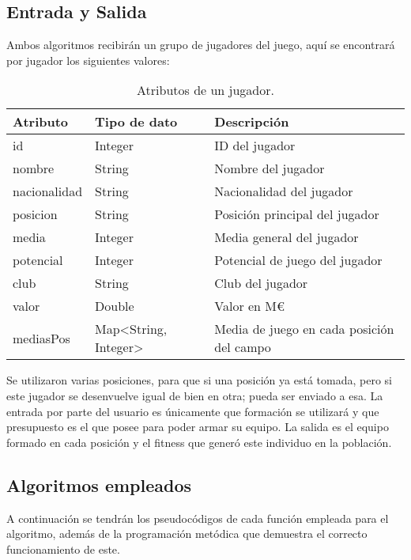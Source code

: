 \documentclass[11pt, twocolumn]{article}
\begin{document}
\subsection{Entrada y Salida}
Ambos algoritmos recibirán un grupo de jugadores del juego, aquí se encontrará por jugador los siguientes valores:

\begin{table}[H]
    \centering
    \begin{tabularx}{\columnwidth}{|X|X|X|}
        \hline
        Atributo & Tipo de dato & Descripción \\
        \hline
        id & Integer & ID del jugador\\
        nombre & String & Nombre del jugador \\
        nacionalidad & String & Nacionalidad del jugador\\
        posicion & String & Posición principal del jugador\\
        media & Integer & Media general del jugador\\
        potencial & Integer & Potencial de juego del jugador\\
        club & String & Club del jugador\\
        valor & Double & Valor en M€\\
        mediasPos & Map<String, Integer> & Media de juego en cada posición del campo\\
        
        \hline
    \end{tabularx}
    \caption{Atributos de un jugador.}
    \label{tab:etiqueta}
\end{table}

Se utilizaron varias posiciones, para que si una posición ya está tomada, pero si este jugador se desenvuelve igual de bien en otra; pueda ser enviado a esa.\newline
La entrada por parte del usuario es únicamente que formación se utilizará y que presupuesto es el que posee para poder armar su equipo.\newline
La salida es el equipo formado en cada posición y el fitness que generó este individuo en la población.

\subsection{Algoritmos empleados}
A continuación se tendrán los pseudocódigos de cada función empleada para el algoritmo, además de la programación metódica que demuestra el correcto funcionamiento de este.
\end{document}

